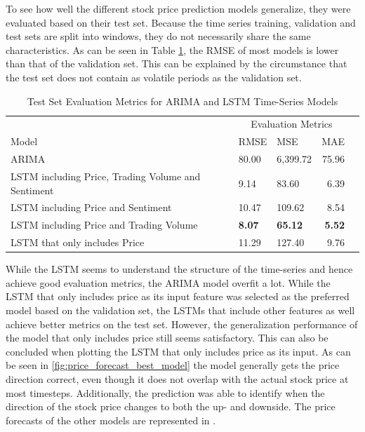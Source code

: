 \documentclass[11pt, a4paper]{article}
\begin{document}
To see how well the different stock price prediction models generalize, they were evaluated based on their test set.
Because the time series training, validation and test sets are split into windows, they do not necessarily share the same
characteristics. As can be seen in Table \ref{tab:results_stocks}, the RMSE of most models is lower than that of the
validation set. This can be explained by the circumstance that the test set does not contain as volatile periods as the
validation set.

\begin{table}[!h]
    \caption{Test Set Evaluation Metrics for ARIMA and LSTM Time-Series Models}
    \label{tab:results_stocks}
    \centering
    \small

    \begin{tabular}{lllrr}
        \toprule
                                        & \multicolumn{3}{c}{Evaluation Metrics} \\
                                        \cmidrule{2-4}
                            Model       & RMSE      & MSE     & MAE    \\
            \midrule
            \multirow{1}{*}{ARIMA}         & 80.00          & 6,399.72          & 75.96 \\
            \midrule
            \multirow{1}{*}{LSTM including Price, Trading Volume and Sentiment}       & 9.14          & 83.60          & 6.39 \\
            \midrule
            \multirow{1}{*}{LSTM including Price and Sentiment}       & 10.47          & 109.62          & 8.54 \\
            \midrule
            \multirow{1}{*}{LSTM including Price and Trading Volume}      & \textbf{8.07}           & \textbf{65.12}          & \textbf{5.52} \\
            \midrule
            \multirow{1}{*}{LSTM that only includes Price}      & 11.29         & 127.40          & 9.76 \\

        \bottomrule
    \end{tabular}

\end{table}

While the LSTM seems to understand the structure of the time-series and hence achieve good evaluation metrics, the ARIMA model
overfit a lot. While the LSTM that only includes price as its input feature was selected as the preferred model based on the
validation set, the LSTMs that include other features as well achieve better metrics on the test set. However, the generalization
performance of the model that only includes price still seems satisfactory.
This can also be concluded when plotting the LSTM that only includes price as its input.
As can be seen in \ref{fig:price_forecast_best_model} the model generally gets the price direction correct, even though it does not
overlap with the actual stock price at most timesteps.
Additionally, the prediction was able to identify when the direction of the stock price changes to both the up- and downside.
The price forecasts of the other models are represented in .
\end{document}

